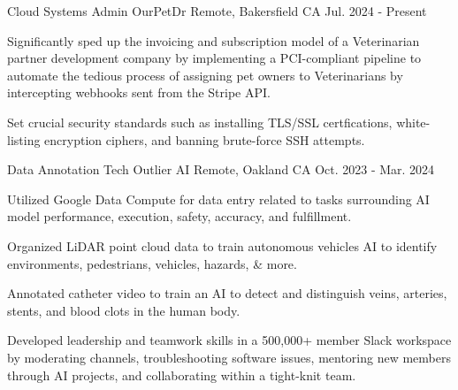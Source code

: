 
\begin{cventries}

  \cventry
    {Cloud Systems Admin} %
    {OurPetDr} %
    {Remote, Bakersfield CA} %
    {Jul. 2024 - Present} %
    {
      \begin{cvitems} %
		  \item {Significantly sped up the invoicing and subscription model of a Veterinarian partner development company by implementing a PCI-compliant pipeline to automate the tedious process of assigning pet owners to Veterinarians by intercepting webhooks sent from the Stripe API.}
		  \item {Set crucial security standards such as installing TLS/SSL certfications, white-listing encryption ciphers, and banning brute-force SSH attempts.}
      \end{cvitems}
    }

  \cventry
    {Data Annotation Tech} %
    {Outlier AI} %
    {Remote, Oakland CA} %
    {Oct. 2023 - Mar. 2024} %
    {
      \begin{cvitems} %
		  \item {Utilized Google Data Compute for data entry related to tasks surrounding AI model performance, execution, safety, accuracy, and fulfillment.}
		  \item {Organized LiDAR point cloud data to train autonomous vehicles AI to identify environments, pedestrians, vehicles, hazards, \& more.}
		  \item {Annotated catheter video to train an AI to detect and distinguish veins, arteries, stents, and blood clots in the human body.}
		  \item {Developed leadership and teamwork skills in a 500,000+ member Slack workspace by moderating channels, troubleshooting software issues, mentoring new members through AI projects, and collaborating within a tight-knit team.}
      \end{cvitems}
    }


\end{cventries}
